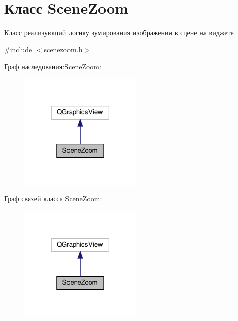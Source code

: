 \hypertarget{classSceneZoom}{}\section{Класс Scene\+Zoom}
\label{classSceneZoom}


Класс реализующий логику зумирования изображения в сцене на виджете  




{\ttfamily \#include $<$scenezoom.\+h$>$}



Граф наследования\+:Scene\+Zoom\+:\nopagebreak
\begin{figure}[H]
\begin{center}
\leavevmode
\includegraphics[width=165pt]{classSceneZoom__inherit__graph}
\end{center}
\end{figure}


Граф связей класса Scene\+Zoom\+:\nopagebreak
\begin{figure}[H]
\begin{center}
\leavevmode
\includegraphics[width=165pt]{classSceneZoom__coll__graph}
\end{center}
\end{figure}
